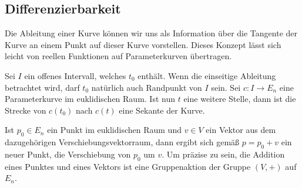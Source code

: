 \subsection{Differenzierbarkeit}
Die Ableitung einer Kurve können wir uns als Information über die
Tangente der Kurve an einem Punkt auf dieser Kurve vorstellen. Dieses
Konzept lässt sich leicht von reellen Funktionen auf Parameterkurven
übertragen.

Sei $I$ ein offenes Intervall, welches $t_0$ enthält. Wenn die einseitige
Ableitung betrachtet wird, darf $t_0$ natürlich auch Randpunkt von $I$
sein. Sei $c\colon I\to E_n$ eine Parameterkurve im euklidischen
Raum. Ist nun $t$ eine weitere Stelle, dann ist die Strecke von
$c(t_0)$ nach $c(t)$ eine Sekante der Kurve.

Ist $p_0\in E_n$ ein Punkt im euklidischen Raum und $v\in V$ ein Vektor
aus dem dazugehörigen Verschiebungsvektorraum, dann ergibt sich
gemäß $p=p_0+v$ ein neuer Punkt, die Verschiebung von $p_0$ um $v$.
Um präzise zu sein, die Addition eines Punktes und eines Vektors ist
eine Gruppenaktion der Gruppe $(V,+)$ auf $E_n$. 

